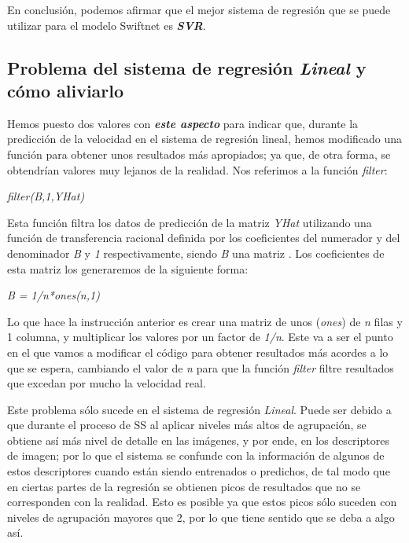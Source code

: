 En conclusión, podemos afirmar que el mejor sistema de regresión que se puede utilizar para el modelo Swiftnet es \textbf{\textit{\ac{SVR}}}.

\subsection{Problema del sistema de regresión \textit{Lineal} y cómo aliviarlo}

Hemos puesto dos valores con \textit{\textbf{este aspecto}} para indicar que, durante la predicción de la velocidad en el sistema de regresión lineal, hemos modificado una función para obtener unos resultados más apropiados; ya que, de otra forma, se obtendrían valores muy lejanos de la realidad. Nos referimos a la función \textit{filter}:

\begin{center}
\textit{filter(B,1,YHat)}
\end{center}

Esta función filtra los datos de predicción de la matriz \textit{YHat} utilizando una función de transferencia racional definida por los coeficientes del numerador y del denominador \textit{B} y \textit{1} respectivamente, siendo \textit{B} una matriz \cite{filter}. Los coeficientes de esta matriz los generaremos de la siguiente forma:

\begin{center}
\textit{B = 1/n*ones(n,1)}
\end{center}

Lo que hace la instrucción anterior es crear una matriz de unos (\textit{ones}) de \textit{n} filas y 1 columna, y multiplicar los valores por un factor de \textit{1/n}. Este va a ser el punto en el que vamos a modificar el código para obtener resultados más acordes a lo que se espera, cambiando el valor de \textit{n} para que la función \textit{filter} filtre resultados que excedan por mucho la velocidad real.

Este problema sólo sucede en el sistema de regresión \textit{Lineal}. Puede ser debido a que durante el proceso de \ac{SS} al aplicar niveles más altos de agrupación, se obtiene así más nivel de detalle en las imágenes, y por ende, en los descriptores de imagen; por lo que el sistema se confunde con la información de algunos de estos descriptores cuando están siendo entrenados o predichos, de tal modo que en ciertas partes de la regresión se obtienen picos de resultados que no se corresponden con la realidad. Esto es posible ya que estos picos sólo suceden con niveles de agrupación mayores que 2, por lo que tiene sentido que se deba a algo así.

